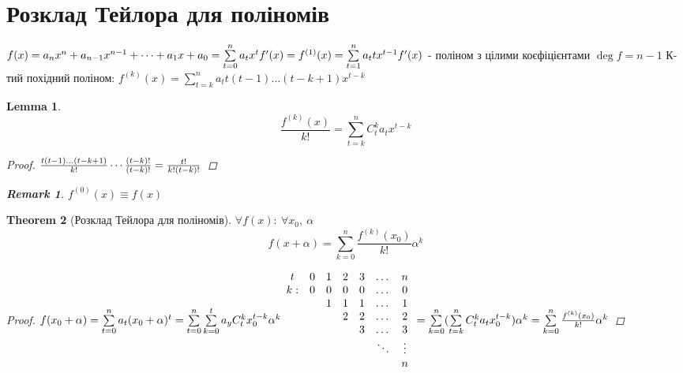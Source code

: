 \documentclass[a4paper,12pt]{bookest}
\newtheorem{theorem}{Theorem}[section]
\newtheorem{lemma}[theorem]{Lemma}
\newtheorem*{remark*}{\emph{Remark}}
\begin{document}
\section{Розклад Тейлора для поліномів}
$f(x)=a_nx^n+a_{n-1}x^{n-1}+\dots+a_1x+a_0=\sum\limits_{t=0}^na_tx^t\\f'(x)=f^{(1)}(x)=\sum\limits_{t=1}^na_ttx^{t-1}\\f'(x)$ - поліном з цілими коєфіцієнтами $\deg f=n-1$
К-тий похідний поліном:
$f^{(k)}(x)=\sum\limits_{t=k}^na_tt(t-1)\dots(t-k+1)x^{t-k}$ 
\begin{lemma}
	$$\frac{f^{(k)}(x)}{k!}=\sum\limits_{t=k}^nC_t^ka_tx^{t-k}$$
	\begin{proof}
		$\\\frac{t(t-1)\dots(t-k+1)}{k!}\cdots\frac{(t-k)!}{(t-k)!}=\frac{t!}{k!(t-k)!}$
	\end{proof}
	\begin{remark*}
		$f^{(0)}(x)\equiv f(x)$
	\end{remark*}
\end{lemma}
\begin{theorem}[Розклад Тейлора для поліномів]$\forall f(x):\>\forall x_0,\>\alpha$
	$$f(x+\alpha)=\sum\limits_{k=0}^{n}\frac{f^{(k)}(x_
	0)}{k!}\alpha^k$$
	\begin{proof}
		$\\f(x_0+\alpha)=\sum\limits_{t=0}^{n}a_t(x_0+\alpha)^t=\sum\limits_{t=0}^{n}\sum\limits_{k=0}^{t}a_yC_t^kx_0^{t-k}\alpha^k\\\begin{array}{ccccccc}
		t & 0 & 1 & 2 & 3 & \dots & n\\
		k: & 0 & 0 & 0 & 0 & \dots & 0\\
		 &  & 1 & 1 & 1 & \dots & 1\\
		  &  &  & 2 & 2 & \dots & 2\\
		   &  &  &  & 3 & \dots & 3\\
		   &  &  &  &  & \ddots & \vdots\\
		      &  &  &  &  & & n
			
		\end{array}\\=\sum\limits_{k=0}^{n}(\sum\limits_{t=k}^{n}C_t^ka_tx_0^{t-k})\alpha^k=\sum\limits_{k=0}^{n}\frac{f^{(k)}(x_0)}{k!}\alpha^k$
	\end{proof}
\end{theorem}
\end{document}
